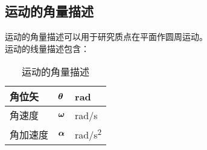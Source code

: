 \documentclass[UTF8]{ctexart}
\newcommand*{\veb}[1]{\vb*{#1}}
\begin{document}
\newpage

\subsection{运动的角量描述}
    运动的角量描述可以用于研究质点在平面作圆周运动。\\[3mm]
    运动的线量描述包含：
    \begin{table}[h]
        \begin{center}
            \begin{tabular}{p{60pt}|p{60 pt}|p{60 pt}}
                \hline
                角位矢&$\veb{\theta}$&\si{rad}\\ \hline
                角速度&$\veb{\omega}$&\si{rad/s}\\ \hline
                角加速度&$\veb{\alpha}$&\si{rad/s^2}\\ \hline
            \end{tabular}
            \caption{运动的角量描述}
        \end{center}
    \end{table}\vspace{-20pt}
\end{document}
